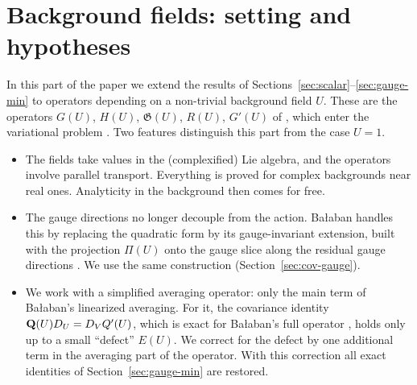\section{Background fields: setting and hypotheses}\label{sec:background}

In this part of the paper we extend the results of Sections~\ref{sec:scalar}--\ref{sec:gauge-min} to operators depending on a non-trivial background field $U$. These are the operators $G(U)$, $H(U)$, $\mathfrak G(U)$, $R(U)$, $G'(U)$ of \cite{BalBackground}, which enter the variational problem \cite{BalVar}. Two features distinguish this part from the case $U=1$.
\begin{itemize}
\item The fields take values in the (complexified) Lie algebra, and the operators involve parallel transport. Everything is proved for complex backgrounds near real ones. Analyticity in the background then comes for free.
\item The gauge directions no longer decouple from the action. Ba\l aban handles this by replacing the quadratic form by its gauge-invariant extension, built with the projection $\Pi(U)$ onto the gauge slice along the residual gauge directions \cite[(3.118)--(3.119)]{BalBackground}. We use the same construction (Section~\ref{sec:cov-gauge}).
\item We work with a simplified averaging operator: only the main term of Ba\l aban's linearized averaging. For it, the covariance identity $\mathbf Q(U)D_U=D_VQ'(U)$, which is exact for Ba\l aban's full operator \cite[(3.114)--(3.115)]{BalBackground}, holds only up to a small ``defect'' $E(U)$. We correct for the defect by one additional term in the averaging part of the operator. With this correction all exact identities of Section~\ref{sec:gauge-min} are restored.
\end{itemize}

